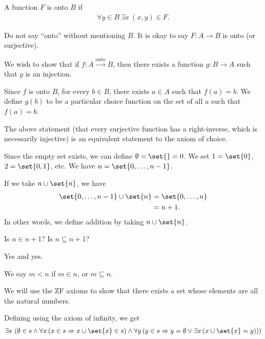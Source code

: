 \documentclass[10pt]{mypackage}
\begin{document}
\begin{definition}
  A function $F$ is onto $B$ if
  \begin{align*}
    \forall\! y\in\!B\: \exists x\: (x,y)\in F.
  \end{align*}
\end{definition}
\begin{remark}
Do not say ``onto'' without mentioning $B$. It is okay to say $F: A\rightarrow B$ is onto (or surjective).
\end{remark}
\begin{example}
  We wish to show that if $f: A\xrightarrow{\text{onto}} B$, then there exists a function $g: B\rightarrow A$ such that $g$ is an injection.\newline

  Since $f$ is onto $B$, for every $b\in B$, there exists $a\in A$ such that $f(a) = b$. We define $g(b)$ to be a particular choice function on the set of all $a$ such that $f(a) = b$.
\end{example}
\begin{remark}
The above statement (that every surjective function has a right-inverse, which is necessarily injective) is an equivalent statement to the axiom of choice.
\end{remark}
\begin{example}
  Since the empty set exists, we can define $\emptyset = \set{} = 0$. We set $1 = \set{0}$, $2 = \set{0,1}$, etc. We have $n = \set{0,\dots,n-1}$.\newline

  If we take $n\cup \set{n}$, we have
  \begin{align*}
    \set{0,\dots,n-1}\cup \set{n} &= \set{0,\dots,n}\\
                                  &= n+1.
  \end{align*}
  In other words, we define addition by taking $n\cup \set{n}$.
\end{example}
\begin{question}
  Is $n\in n+1$? Is $n\subseteq n+1$?
\begin{answer}
  Yes and yes.
\end{answer}
\end{question}
\begin{definition}
  We say $m < n$ if $m\in n$, or $m\subseteq n$.
\end{definition}
\begin{example}
  We will use the ZF axioms to show that there exists a set whose elements are all the natural numbers.\newline

  Defining using the axiom of infinity, we get
  \begin{align*}
    \exists s\:\left(\emptyset \in s \wedge \forall x\left(x\in s \Rightarrow x\cup \set{x}\in s\right)\wedge \forall y\left(y\in s \Rightarrow y = \emptyset \vee \exists x\left(x\cup \set{x} = y\right)\right)\right)
  \end{align*}
\end{example}
\end{document}
